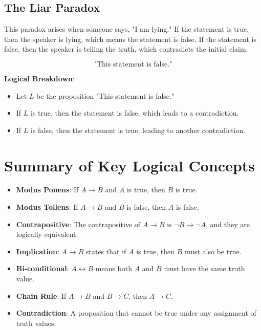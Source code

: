\documentclass{article}
\begin{document}
\subsection{The Liar Paradox}

This paradox arises when someone says, "I am lying." If the statement is true, then the speaker is lying, which means the statement is false. If the statement is false, then the speaker is telling the truth, which contradicts the initial claim.

\[
\text{"This statement is false."}
\]

\textbf{Logical Breakdown}:
\begin{itemize}
    \item Let $L$ be the proposition "This statement is false."
    \item If $L$ is true, then the statement is false, which leads to a contradiction.
    \item If $L$ is false, then the statement is true, leading to another contradiction.
\end{itemize}

\section{Summary of Key Logical Concepts}

\begin{itemize}
    \item \textbf{Modus Ponens}: If $A \rightarrow B$ and $A$ is true, then $B$ is true.
    \item \textbf{Modus Tollens}: If $A \rightarrow B$ and $B$ is false, then $A$ is false.
    \item \textbf{Contrapositive}: The contrapositive of $A \rightarrow B$ is $\neg B \rightarrow \neg A$, and they are logically equivalent.
    \item \textbf{Implication}: $A \rightarrow B$ states that if $A$ is true, then $B$ must also be true.
    \item \textbf{Bi-conditional}: $A \leftrightarrow B$ means both $A$ and $B$ must have the same truth value.
    \item \textbf{Chain Rule}: If $A \rightarrow B$ and $B \rightarrow C$, then $A \rightarrow C$.
    \item \textbf{Contradiction}: A proposition that cannot be true under any assignment of truth values.
\end{itemize}






\end{document}
